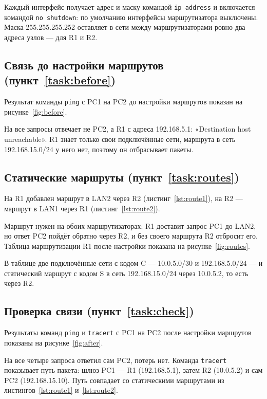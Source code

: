 Каждый интерфейс получает адрес и маску командой \texttt{ip address} и включается командой
\texttt{no shutdown}: по умолчанию интерфейсы маршрутизатора выключены. Маска
255.255.255.252 оставляет в сети между маршрутизаторами ровно два адреса узлов — для R1 и
R2.

\subsection{Связь до настройки маршрутов (пункт~\ref{task:before})}
Результат команды \texttt{ping} с PC1 на PC2 до настройки маршрутов показан на
рисунке~\ref{fig:before}.


На все запросы отвечает не PC2, а R1 с адреса 192.168.5.1: «Destination host unreachable».
R1 знает только свои подключённые сети, маршрута в сеть 192.168.15.0/24 у него нет, поэтому
он отбрасывает пакеты.

\subsection{Статические маршруты (пункт~\ref{task:routes})}
На R1 добавлен маршрут в LAN2 через R2 (листинг~\ref{lst:route1}), на R2 — маршрут в LAN1
через R1 (листинг~\ref{lst:route2}).



Маршрут нужен на обоих маршрутизаторах: R1 доставит запрос PC1 до LAN2, но ответ PC2 пойдёт
обратно через R2, и без своего маршрута R2 отбросит его. Таблица маршрутизации R1 после
настройки показана на рисунке~\ref{fig:routes}.


В таблице две подключённые сети с кодом C — 10.0.5.0/30 и 192.168.5.0/24 — и статический
маршрут с кодом S в сеть 192.168.15.0/24 через 10.0.5.2, то есть через R2.

\subsection{Проверка связи (пункт~\ref{task:check})}
Результаты команд \texttt{ping} и \texttt{tracert} с PC1 на PC2 после настройки маршрутов
показаны на рисунке~\ref{fig:after}.


На все четыре запроса ответил сам PC2, потерь нет. Команда \texttt{tracert} показывает путь
пакета: шлюз PC1 — R1 (192.168.5.1), затем R2 (10.0.5.2) и сам PC2 (192.168.15.10). Путь
совпадает со статическими маршрутами из листингов~\ref{lst:route1} и~\ref{lst:route2}.
